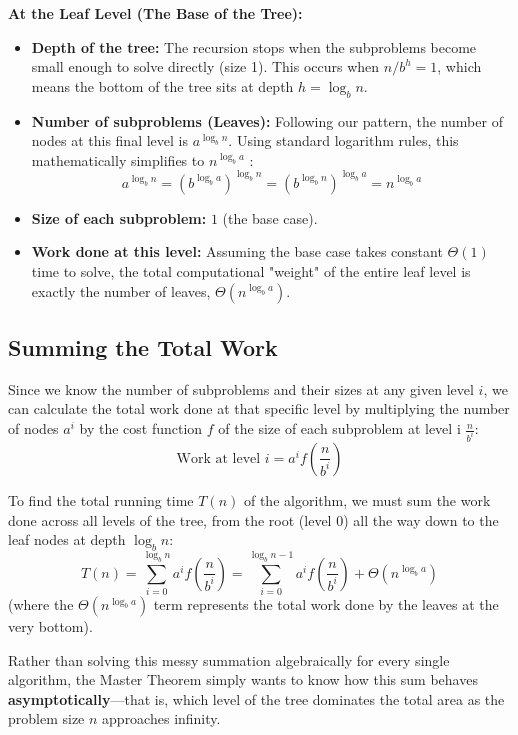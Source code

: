 \documentclass[11pt, a4paper]{article}
\begin{document}
\vspace{0.5cm}
\noindent\textbf{At the Leaf Level (The Base of the Tree):}
\begin{itemize}
    \item \textbf{Depth of the tree:} The recursion stops when the subproblems become small enough to solve directly (size 1). This occurs when $n/b^h= 1$, which means the bottom of the tree sits at depth $h = \log_b n$.
    \item \textbf{Number of subproblems (Leaves):} Following our pattern, the number of nodes at this final level is $a^{\log_b n}$. Using standard logarithm rules, this mathematically simplifies to $n^{\log_b a}$ :
        \[ a^{\log_b n} = (b^{\log_b a})^{\log_b n} = (b^{\log_b n})^{\log_b a} = n^{\log_b a} \]
    \item \textbf{Size of each subproblem:} $1$ (the base case).
    \item \textbf{Work done at this level:} Assuming the base case takes constant $\Theta(1)$ time to solve, the total computational "weight" of the entire leaf level is exactly the number of leaves, $\Theta(n^{\log_b a})$. 
\end{itemize}

\subsection*{Summing the Total Work} 
Since we know the number of subproblems and their sizes at any given level $i$, we can calculate the total work done at that specific level by multiplying the number of nodes $a^i$ by the cost function $f$ of the size of each subproblem at level i $\frac{n}{b^i}$:
\begin{equation*}
    \text{Work at level } i = a^i f\left(\frac{n}{b^i}\right)
\end{equation*}

To find the total running time $T(n)$ of the algorithm, we must sum the work done across all levels of the tree, from the root (level 0) all the way down to the leaf nodes at depth $\log_b n$:
\begin{equation*}
    T(n) = \sum_{i=0}^{\log_b n} a^i f\left(\frac{n}{b^i}\right) = \sum_{i=0}^{\log_b n - 1} a^i f\left(\frac{n}{b^i}\right) + \Theta(n^{\log_b a})
\end{equation*}
(where the $\Theta(n^{\log_b a})$ term represents the total work done by the leaves at the very bottom).

Rather than solving this messy summation algebraically for every single algorithm, the Master Theorem simply wants to know how this sum behaves \textbf{asymptotically}---that is, which level of the tree dominates the total area as the problem size $n$ approaches infinity. 
\end{document}
